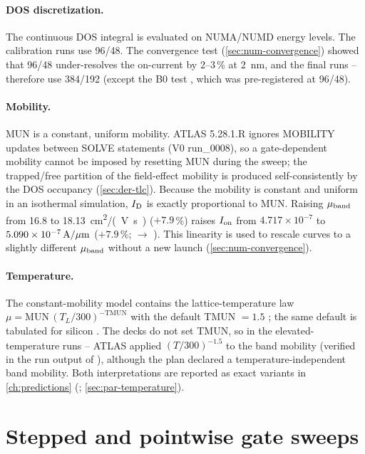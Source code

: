 \paragraph{DOS discretization.} The continuous DOS integral is evaluated on NUMA/NUMD energy levels. The calibration runs
use 96/48. The convergence test (\cref{sec:num-convergence}) showed that 96/48 under-resolves the on-current by
2--3\,\% at \SI{2}{nm}, and the final runs -- therefore use 384/192 (except the B0 test ,
which was pre-registered at 96/48).

\paragraph{Mobility.} MUN is a constant, uniform mobility. ATLAS 5.28.1.R ignores MOBILITY updates between SOLVE
statements (V0 run\_0008), so a gate-dependent mobility cannot be imposed by resetting MUN during the sweep; the
trapped/free partition of the field-effect mobility is produced self-consistently by the DOS occupancy
(\cref{sec:der-tlc}). Because the mobility is constant and uniform in an isothermal simulation, $I_{\mathrm{D}}$ is exactly
proportional to MUN. Raising $\mu_{\mathrm{band}}$ from 16.8 to \SI{18.13}{cm^2/(V.s)} ($+7.9$\,\%) raises $I_{\mathrm{on}}$ from
$4.717\times10^{-7}$ to $5.090\times10^{-7}\,\mathrm{A}/\mu\mathrm{m}$ ($+7.9$\,\%;  $\rightarrow$ ). This linearity is
used to rescale curves to a slightly different $\mu_{\mathrm{band}}$ without a new launch (\cref{sec:num-convergence}).

\paragraph{Temperature.} The constant-mobility model contains the lattice-temperature law
$\mu = \mathrm{MUN}\,(T_L/300)^{-\mathrm{TMUN}}$ with the default TMUN $= 1.5$ \citep[p.~179]{AtlasManual}; the same
default is tabulated for silicon \citep[p.~1672]{AtlasManual}. The decks do not set TMUN, so in the elevated-temperature
runs -- ATLAS applied $(T/300)^{-1.5}$ to the band mobility (verified in the run output of
), although the plan declared a temperature-independent band mobility. Both interpretations are reported as
exact variants in \cref{ch:predictions} (\evCORR; \cref{sec:par-temperature}).

\section{Stepped and pointwise gate sweeps}\label{sec:num-sweep}

